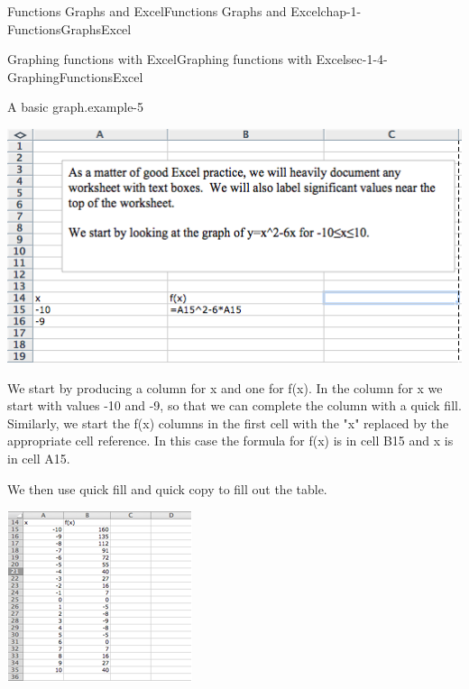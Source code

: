 \documentclass[oneside,10pt,]{book}
\numberwithin{equation}{section}
\begin{document}
\begin{chapterptx}{Functions Graphs and Excel}{}{Functions Graphs and Excel}{}{}{chap-1-FunctionsGraphsExcel}
\begin{sectionptx}{Graphing functions with Excel}{}{Graphing functions with Excel}{}{}{sec-1-4-GraphingFunctionsExcel}
\begin{example}{A basic graph.}{example-5}
\begin{sidebyside}{1}{0.1}{0.1}{0}
\begin{sbspanel}{0.8}%
\includegraphics[width=1\linewidth]{images/sec1-4-1.png}
\end{sbspanel}%
\end{sidebyside}%
\par
\hypertarget{p-317}{}%
We start by producing a column for x and one for f(x).  In the column for x we start with values -10 and -9, so that we can complete the column with a quick fill.  Similarly, we start the f(x) columns in the first cell with the "x" replaced by the appropriate cell reference.  In this case the formula for f(x) is in cell B15 and x is in cell A15.%
\par
\hypertarget{p-318}{}%
We then use quick fill and quick copy to fill out the table.%
\begin{sidebyside}{1}{0.2}{0.2}{0}%
\begin{sbspanel}{0.6}%
\includegraphics[width=1\linewidth]{images/sec1-4-2.png}

\end{sbspanel}
\end{sidebyside}
\end{example}
\end{sectionptx}
\end{chapterptx}
\end{document}
